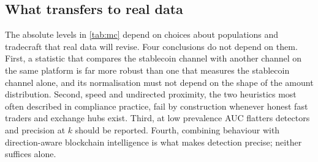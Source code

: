 \subsection{What transfers to real data}

The absolute levels in \cref{tab:mc} depend on choices about populations and tradecraft that real data will revise.
Four conclusions do not depend on them. First, a statistic that compares the stablecoin channel with another channel on
the same platform is far more robust than one that measures the stablecoin channel alone, and its normalisation must
not depend on the shape of the amount distribution. Second, speed and undirected proximity, the two heuristics most
often described in compliance practice, fail by construction whenever honest fast traders and exchange hubs exist.
Third, at low prevalence AUC flatters detectors and precision at $k$ should be reported. Fourth, combining behaviour
with direction-aware blockchain intelligence is what makes detection precise; neither suffices alone.

